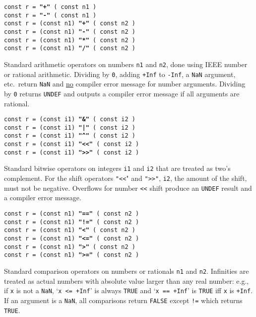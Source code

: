 \documentclass[12pt]{article}
\newcommand{\ttkey}[1]{{\tt \bfseries #1}}
\newenvironment{indpar}[1][0.3in]%
	{\begin{list}{}%
		     {\setlength{\itemsep}{0in}%
		      \setlength{\topsep}{0in}%
		      \setlength{\parsep}{1ex}%
		      \setlength{\labelwidth}{#1}%
		      \setlength{\leftmargin}{#1}%
		      \addtolength{\leftmargin}{\labelsep}}%
	 \item}%
	{\end{list}}
\begin{document}
{\tt const r = \ttkey{"+"} ( const n1 )} \\
{\tt const r = \ttkey{"-"} ( const n1 )} \\
{\tt const r = (const n1) \ttkey{"+"} ( const n2 )} \\
{\tt const r = (const n1) \ttkey{"-"} ( const n2 )} \\
{\tt const r = (const n1) \ttkey{"*"} ( const n2 )} \\
{\tt const r = (const n1) \ttkey{"/"} ( const n2 )}
\begin{indpar}
Standard arithmetic operators on numbers {\tt n1} and {\tt n2},
done using IEEE number or rational arithmetic.
Dividing by {\tt 0},
adding {\tt +Inf} to {\tt -Inf}, a {\tt NaN} argument, etc.~return
{\tt NaN} and \underline{no} compiler error message for number
arguments.  Dividing by {\tt 0} returns {\tt UNDEF} and outputs a
compiler error message if all arguments are rational.
\end{indpar}

{\tt const r = (const i1) \ttkey{"\&"} ( const i2 )} \\
{\tt const r = (const i1) \ttkey{"|"} ( const i2 )} \\
{\tt const r = (const i1) \ttkey{"\textasciicircum"} ( const i2 )} \\
{\tt const r = (const i1) \ttkey{"<{}<"} ( const i2 )} \\
{\tt const r = (const i1) \ttkey{">{}>"} ( const i2 )}
\begin{indpar}
Standard bitwise operators on integers {\tt i1} and {\tt i2}
that are treated as two's complement.  For the shift operators
{\tt "<{}<}" and {\tt ">{}>"}, {\tt i2}, the amount of the shift,
must not be negative.  Overflows for number {\tt <{}<} shift
produce an {\tt UNDEF} result and a compiler error message.
\end{indpar}

{\tt const r = (const n1) \ttkey{"=="} ( const n2 )} \\
{\tt const r = (const n1) \ttkey{"!="} ( const n2 )} \\
{\tt const r = (const n1) \ttkey{"<"} ( const n2 )} \\
{\tt const r = (const n1) \ttkey{"<="} ( const n2 )} \\
{\tt const r = (const n1) \ttkey{">"} ( const n2 )} \\
{\tt const r = (const n1) \ttkey{">="} ( const n2 )}
\begin{indpar}
Standard comparison operators on numbers or rationals {\tt n1} and {\tt n2}.
Infinities are treated as actual numbers with absolute value
larger than any real number: e.g., if {\tt x} is not a {\tt NaN},
`{\tt x <= +Inf}' is always
{\tt TRUE} and `{\tt x == +Inf}' is {\tt TRUE} iff {\tt x} is {\tt +Inf}.
If an argument is a {\tt NaN}, all comparisons return {\tt FALSE}
except {\tt !=} which returns {\tt TRUE}.
\end{indpar}
\end{document}
